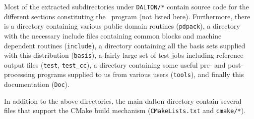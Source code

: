 Most of the extracted subdirectories under \verb|DALTON/*| contain source code
for the different sections constituting the \dalton\ program (not listed here).
Furthermore, there is a
directory containing various public domain routines (\verb|pdpack|), a
directory with the necessary include files containing common blocks and machine
dependent routines (\verb|include|), a directory containing all the basis sets
supplied with this distribution (\verb|basis|), a fairly large set of test jobs
including reference output files (\verb|test|, \verb|test_cc|), a directory
containing some useful pre- and post-processing programs supplied to us from
various users (\verb|tools|), and finally this documentation (\verb|Doc|).

In addition to the above directories, the main dalton directory contain several
files that support the CMake build mechanism (\verb|CMakeLists.txt| and \verb|cmake/*|).
